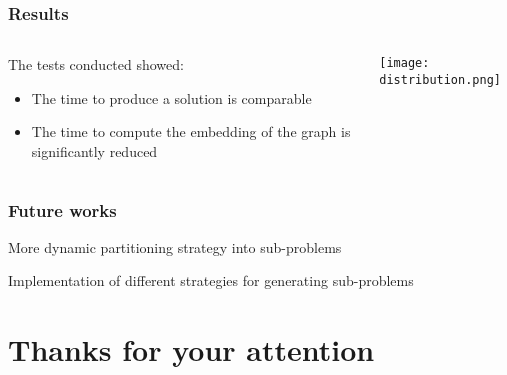 \documentclass[aspectratio=169]{beamer}
\begin{document}
\begin{frame}\frametitle{Results}

    \begin{columns}
        \begin{column}{0.4\textwidth}
            The tests conducted showed:

            \begin{itemize}
                \item The time to produce a solution is comparable
                \item The time to compute the embedding of the graph is significantly reduced
            \end{itemize}
        \end{column}
        \begin{column}{0.6\textwidth}
            \begin{flushright}
                \texttt{[image: distribution.png]}            
            \end{flushright}
        \end{column}
    \end{columns}

\end{frame}

\begin{frame}\frametitle{Future works}

    \begin{center}
        More dynamic partitioning strategy into sub-problems 
            
        Implementation of different strategies for generating sub-problems
    \end{center}

\end{frame}

\section{Thanks for your attention}
\end{document}
